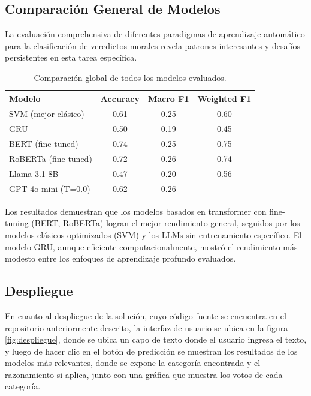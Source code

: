 \subsection{Comparación General de Modelos}

La evaluación comprehensiva de diferentes paradigmas de aprendizaje automático para la clasificación de veredictos morales revela patrones interesantes y desafíos persistentes en esta tarea específica.

\begin{table}[H]
\centering
\caption{Comparación global de todos los modelos evaluados.}
\begin{tabular}{lccc}
\toprule
\textbf{Modelo} & \textbf{Accuracy} & \textbf{Macro F1} & \textbf{Weighted F1} \\
\midrule
SVM (mejor clásico) & 0.61 & 0.25 & 0.60 \\
GRU & 0.50 & 0.19 & 0.45 \\
BERT (fine-tuned) & 0.74 & 0.25 & 0.75 \\
RoBERTa (fine-tuned) & 0.72 & 0.26 & 0.74 \\
Llama 3.1 8B & 0.47 & 0.20 & 0.56 \\
GPT-4o mini (T=0.0) & 0.62 & 0.26 & - \\
\bottomrule
\end{tabular}
\end{table}

Los resultados demuestran que los modelos basados en transformer con fine-tuning (BERT, RoBERTa) logran el mejor rendimiento general, seguidos por los modelos clásicos optimizados (SVM) y los LLMs sin entrenamiento específico. El modelo GRU, aunque eficiente computacionalmente, mostró el rendimiento más modesto entre los enfoques de aprendizaje profundo evaluados.

\subsection{Despliegue}

En cuanto al despliegue de la solución, cuyo código fuente se encuentra en el repositorio anteriormente descrito, la interfaz de usuario se ubica en la figura \ref{fig:despliegue}, donde se ubica un capo de texto donde el usuario ingresa el texto, y luego de hacer clic en el botón de predicción se muestran los resultados de los modelos más relevantes, donde se expone la categoría encontrada y el razonamiento si aplica, junto con una gráfica que muestra los votos de cada categoría.


